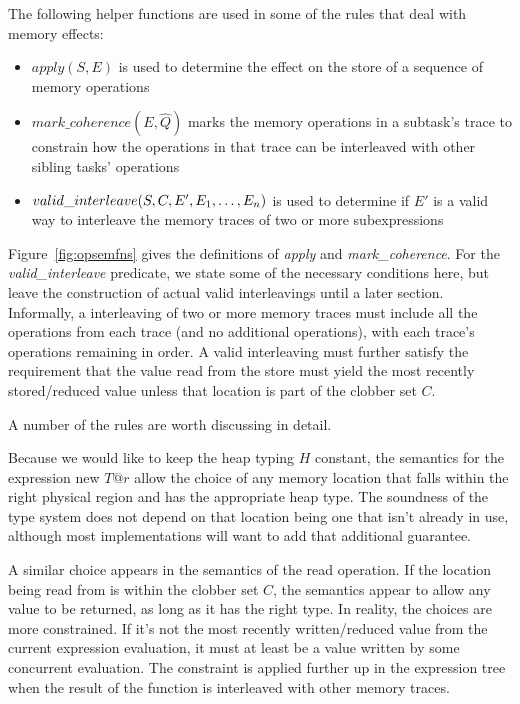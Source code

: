 \begin{itemize}
The following helper functions are used in some of the rules that deal with memory effects:
\begin{itemize}
\item $apply(S, E)$ is used to determine the effect on the store of a sequence of memory operations
\item $mark\_coherence(E, \hat Q)$ marks the memory operations in a subtask's trace to
constrain how the operations in that trace can be interleaved with other sibling tasks' operations
\item $valid\_interleave(S, C, E', {E}_1,\ldots,{E}_n)$ is used to determine if $E'$ is a valid way to
interleave the memory traces of two or more subexpressions
\end{itemize}
Figure~\ref{fig:opsemfns} gives the definitions of {\em apply} and {\em mark\_coherence}.  For
the {\em valid\_interleave} predicate, we state some of the necessary conditions here, but leave 
the construction of actual valid interleavings until a later section.  Informally, a interleaving
of two or more memory traces must include all the operations from each trace (and no additional
operations), with each trace's operations remaining in order.  A valid interleaving must further
satisfy the requirement that the value read from the store must yield the most recently 
stored/reduced value unless that location is part of the clobber set $C$.
\end{itemize}

A number of the rules are worth discussing in detail.

Because we would like to keep the heap typing $H$ constant, the semantics for the expression
new $T@r$ allow the choice of any memory location that falls within the right physical region
and has the appropriate heap type.  The soundness of the type system does not depend on that
location being one that isn't already in use, although most implementations will want to 
add that additional guarantee.

A similar choice appears in the semantics of the read operation.  If the location being read
from is within the clobber set $C$, the semantics appear to allow any value to be returned, as
long as it has the right type.  In reality, the choices are more constrained.  If it's not the
most recently written/reduced value from the current expression evaluation, it must at least be
a value written by some concurrent evaluation.  The constraint is applied further up in the 
expression tree when the result of the function is interleaved with other memory traces.

